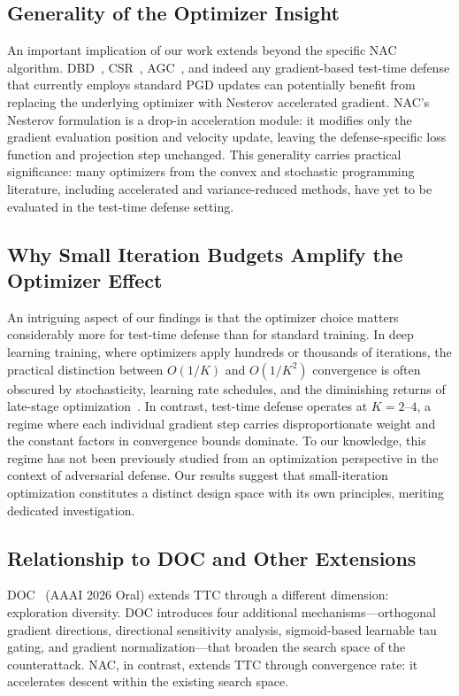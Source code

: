 \documentclass[pdflatex,sn-basic,Numbered]{sn-jnl}
\theoremstyle{thmstyleone}
\theoremstyle{thmstyletwo}
\theoremstyle{thmstylethree}
\begin{document}
\subsection{Generality of the Optimizer Insight}

An important implication of our work extends beyond the specific NAC algorithm. DBD~\cite{liu2026directional}, CSR~\cite{nie2025contrastive}, AGC~\cite{li2026agc}, and indeed any gradient-based test-time defense that currently employs standard PGD updates can potentially benefit from replacing the underlying optimizer with Nesterov accelerated gradient. NAC's Nesterov formulation is a drop-in acceleration module: it modifies only the gradient evaluation position and velocity update, leaving the defense-specific loss function and projection step unchanged. This generality carries practical significance: many optimizers from the convex and stochastic programming literature, including accelerated and variance-reduced methods, have yet to be evaluated in the test-time defense setting.

\subsection{Why Small Iteration Budgets Amplify the Optimizer Effect}

An intriguing aspect of our findings is that the optimizer choice matters considerably more for test-time defense than for standard training. In deep learning training, where optimizers apply hundreds or thousands of iterations, the practical distinction between $O(1/K)$ and $O(1/K^2)$ convergence is often obscured by stochasticity, learning rate schedules, and the diminishing returns of late-stage optimization~\cite{kingma2015adam}. In contrast, test-time defense operates at $K=2$--$4$, a regime where each individual gradient step carries disproportionate weight and the constant factors in convergence bounds dominate. To our knowledge, this regime has not been previously studied from an optimization perspective in the context of adversarial defense. Our results suggest that small-iteration optimization constitutes a distinct design space with its own principles, meriting dedicated investigation.

\subsection{Relationship to DOC and Other Extensions}

DOC~\cite{jiang2026diversifying} (AAAI 2026 Oral) extends TTC through a different dimension: exploration diversity. DOC introduces four additional mechanisms---orthogonal gradient directions, directional sensitivity analysis, sigmoid-based learnable tau gating, and gradient normalization---that broaden the search space of the counterattack. NAC, in contrast, extends TTC through convergence rate: it accelerates descent within the existing search space.
\end{document}
